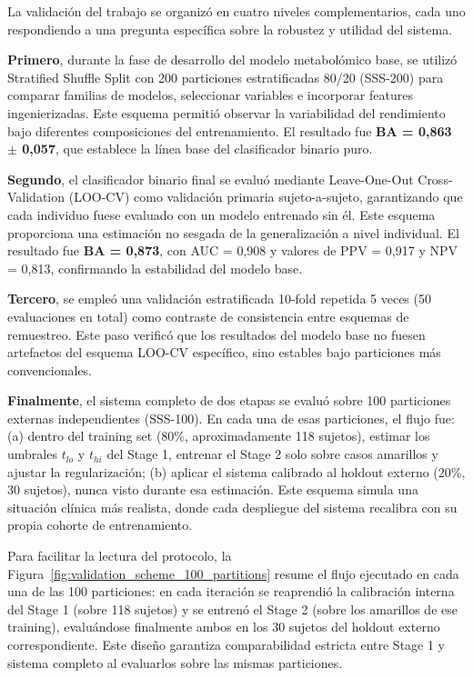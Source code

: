 La validación del trabajo se organizó en cuatro niveles complementarios, cada uno respondiendo a una pregunta específica sobre la robustez y utilidad del sistema.

\textbf{Primero}, durante la fase de desarrollo del modelo metabolómico base, se utilizó Stratified Shuffle Split con 200 particiones estratificadas 80/20 (SSS-200) para comparar familias de modelos, seleccionar variables e incorporar features ingenierizadas. Este esquema permitió observar la variabilidad del rendimiento bajo diferentes composiciones del entrenamiento. El resultado fue \textbf{BA = 0,863 $\pm$ 0,057}, que establece la línea base del clasificador binario puro.

\textbf{Segundo}, el clasificador binario final se evaluó mediante Leave-One-Out Cross-Validation (LOO-CV) como validación primaria sujeto-a-sujeto, garantizando que cada individuo fuese evaluado con un modelo entrenado sin él. Este esquema proporciona una estimación no sesgada de la generalización a nivel individual. El resultado fue \textbf{BA = 0,873}, con AUC = 0,908 y valores de PPV = 0,917 y NPV = 0,813, confirmando la estabilidad del modelo base.

\textbf{Tercero}, se empleó una validación estratificada 10-fold repetida 5 veces (50 evaluaciones en total) como contraste de consistencia entre esquemas de remuestreo. Este paso verificó que los resultados del modelo base no fuesen artefactos del esquema LOO-CV específico, sino estables bajo particiones más convencionales.

\textbf{Finalmente}, el sistema completo de dos etapas se evaluó sobre 100 particiones externas independientes (SSS-100). En cada una de esas particiones, el flujo fue: (a) dentro del training set (80\%, aproximadamente 118 sujetos), estimar los umbrales $t_{lo}$ y $t_{hi}$ del Stage 1, entrenar el Stage 2 solo sobre casos amarillos y ajustar la regularización; (b) aplicar el sistema calibrado al holdout externo (20\%, 30 sujetos), nunca visto durante esa estimación. Este esquema simula una situación clínica más realista, donde cada despliegue del sistema recalibra con su propia cohorte de entrenamiento.

Para facilitar la lectura del protocolo, la Figura~\ref{fig:validation_scheme_100_partitions} resume el flujo ejecutado en cada una de las 100 particiones: en cada iteración se reaprendió la calibración interna del Stage 1 (sobre 118 sujetos) y se entrenó el Stage 2 (sobre los amarillos de ese training), evaluándose finalmente ambos en los 30 sujetos del holdout externo correspondiente. Este diseño garantiza comparabilidad estricta entre Stage 1 y sistema completo al evaluarlos sobre las mismas particiones.

